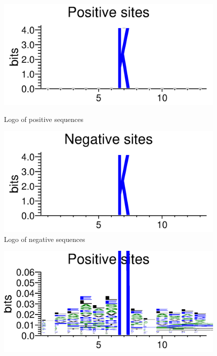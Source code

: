 \documentclass{article}
\begin{document}
\begin{enumerate}
    \begin{figure}[htbp]
        \parbox{0.5\linewidth}{
            \centering
            \includegraphics[width=\linewidth]{images/positive_logo.png}
            \caption{Logo of positive sequences}
            \label{fig:pos-logo}
        }
        \hfill
        \parbox{0.5\linewidth}{
            \centering
            \includegraphics[width=\linewidth]{images/negative_logo.png}
            \caption{Logo of negative sequences}
            \label{fig:neg-logo}
        }
    \end{figure}
    \begin{figure}[htbp]
        \parbox{0.5\linewidth}{
            \centering
            \includegraphics[width=\linewidth]{images/positive_logo_zoom.png}
}
\end{figure}
\end{enumerate}
\end{document}
